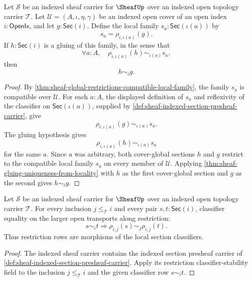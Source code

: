 \begin{corollary}
\label{cor:sheaf-gluing-global-restrictions-idempotent}
Let $\mathcal{S}$ be an indexed sheaf carrier for $\SheafUp$ over an indexed open topology carrier $\mathcal{T}$. Let $\mathcal{U}=(A,\iota,\eta,\gamma)$ be an indexed open cover of an open index $i:\mathsf{OpenIx}$, and let $g:\mathsf{Sec}(i)$. Define the local family $s_a:\mathsf{Sec}(\iota(a))$ by
$$
s_a=\rho_{i,\iota(a)}(g).
$$
If $h:\mathsf{Sec}(i)$ is a gluing of this family, in the sense that
$$
\forall a:A,\quad \rho_{i,\iota(a)}(h)\sim_{\iota(a)}s_a,
$$
then
$$
h\sim_i g.
$$
\end{corollary}
\begin{proof}
By \autoref{thm:sheaf-global-restrictions-compatible-local-family}, the family $s_a$ is compatible over $\mathcal{U}$. For each $a:A$, the displayed definition of $s_a$ and reflexivity of the classifier on $\mathsf{Sec}(\iota(a))$, supplied by \autoref{def:sheaf-indexed-section-presheaf-carrier}, give
$$
\rho_{i,\iota(a)}(g)\sim_{\iota(a)}s_a.
$$
The gluing hypothesis gives
$$
\rho_{i,\iota(a)}(h)\sim_{\iota(a)}s_a
$$
for the same $a$. Since $a$ was arbitrary, both cover-global sections $h$ and $g$ restrict to the compatible local family $s_a$ on every member of $\mathcal{U}$. Applying \autoref{thm:sheaf-gluing-uniqueness-from-locality} with $h$ as the first cover-global section and $g$ as the second gives $h\sim_i g$.
\end{proof}

\begin{theorem}
\label{thm:sheaf-restriction-classifier-transport}
Let $\mathcal{S}$ be an indexed sheaf carrier for $\SheafUp$ over an indexed open topology carrier $\mathcal{T}$. For every inclusion $j\le_{\mathcal{T}}i$ and every pair $s,t:\mathsf{Sec}(i)$, classifier equality on the larger open transports along restriction:
$$
s\sim_i t
\Longrightarrow
\rho_{i,j}(s)\sim_j\rho_{i,j}(t).
$$
Thus restriction rows are morphisms of the local section classifiers.
\end{theorem}
\begin{proof}
The indexed sheaf carrier contains the indexed section presheaf carrier of \autoref{def:sheaf-indexed-section-presheaf-carrier}. Apply its restriction classifier-stability field to the inclusion $j\le_{\mathcal{T}}i$ and the given classifier row $s\sim_i t$.
\end{proof}


